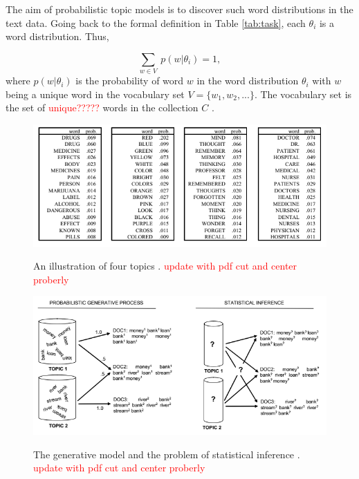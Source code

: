 \documentclass[11pt,a4paper,english,oneside]{book}
\numberwithin{equation}{chapter}
\begin{document}
The aim of probabilistic topic models is to discover such word distributions in the text data. Going back to the formal definition in Table \ref{tab:task}, each $\theta_i$ is a word distribution. Thus,

$$
\underset{w \in V}{\sum} \ p(w | \theta_i) = 1,
$$
where $p(w | \theta_i)$ is the probability of word $w$ in the word distribution $\theta_i$ with $w$ being a unique word in the vocabulary set $V = \{w_1, w_2, ...\}$. The vocabulary set is the set of \textcolor{red}{unique?????} words in the collection $C$ \cite[pp.~338]{Zhai.2016}.

\begin{figure}
	\caption{An illustration of four topics \cite[p.2]{Steyvers(2007)}. \textcolor{red}{update with pdf cut and center proberly}}
	\centering
	\includegraphics[scale=0.8]{Images/SteyversGriffithsTopics.png}
	\label{fourtopics}
\end{figure}

\begin{figure}
	\caption{The generative model and the problem of statistical inference \cite[p.3]{Steyvers(2007)}. \textcolor{red}{update with pdf cut and center proberly}}
	\centering
	\includegraphics[scale=0.8]{Images/genproc.png}
	\label{genproc}
\end{figure}
\end{document}
